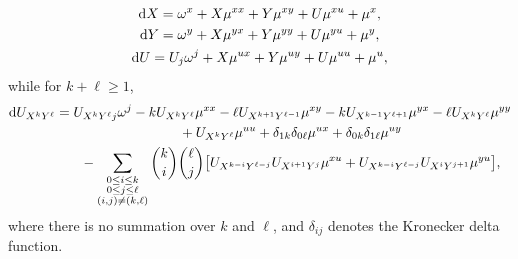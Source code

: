 \documentclass[pdftex]{sigma}%
\numberwithin{equation}{section}
\begin{document}
%
\begin{gather*}
{\rm d}X = \omega^x + X \mu^{xx} + Y\mu^{xy} + U \mu^{xu} + \mu^x,
\\
{\rm d}Y = \omega^y + X \mu^{yx} + Y\mu^{yy} + U\mu^{yu} + \mu^y,
\\
{\rm d}U = U_j \omega^j + X\mu^{ux} + Y \mu^{uy} + U\mu^{uu} + \mu^u,
\end{gather*}
%
while for $k+\ell\geq 1$,
%
\begin{gather*}
{\rm d}U_{X^kY^\ell} = U_{X^kY^\ell j} \omega^j - k U_{X^k Y^\ell} \mu^{xx} - \ell U_{X^{k+1}Y^{\ell-1}} \mu^{xy} - k U_{X^{k-1}Y^{\ell+1}} \mu^{yx} - \ell U_{X^k Y^\ell} \mu^{yy}
\\ \hphantom{{\rm d}U_{X^kY^\ell} =}
{} + U_{X^k Y^\ell} \mu^{uu} + \delta_{1k}\delta_{0\ell} \mu^{ux} + \delta_{0k}\delta_{1\ell} \mu^{uy}
\\ \hphantom{{\rm d}U_{X^kY^\ell} =}
{} - \sum_{\substack{0\leq i \leq k\\0\leq j\leq \ell\\ (i,j)\neq (k,\ell)}} \binom{k}{i}\binom{\ell}{j} \big[ U_{X^{k-i}Y^{\ell-j}} U_{X^{i+1}Y^j} \mu^{xu} + U_{X^{k-i}Y^{\ell-j}} U_{X^i Y^{j+1}} \mu^{yu}\big],
\end{gather*}
where there is no summation over $k$ and $\ell$, and $\delta_{ij}$ denotes the Kronecker delta function.
\end{document}
